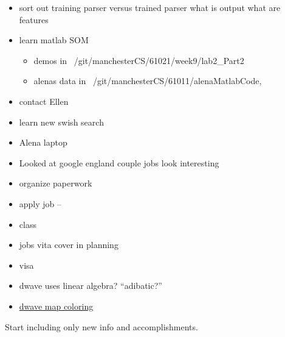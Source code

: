 \documentclass[hyperref]{labbook}
\begin{document}
\begin{itemize}
\item sort out training parser versus trained parser  what is output  what are features
\item learn matlab SOM
  \begin{itemize}
  \item demos in  ~/git/manchesterCS/61021/week9/lab2\_Part2
  \item alenas data in ~/git/manchesterCS/61011/alenaMatlabCode,
  \end{itemize}

\item contact Ellen
\end{itemize}

\begin{itemize}
\item learn new swish search
\item Alena laptop
\end{itemize}

\begin{itemize}
\item Looked at google england couple jobs look interesting
\item organize paperwork
\item apply job  -- 
\end{itemize}

\begin{itemize}
\item class
\item jobs vita  cover  in planning
\item visa
\item dwave uses linear algebra?  ``adibatic?''
\item \href{https://www.dwavesys.com/sites/default/files/Map%20Coloring%20WP2.pdf}{dwave map coloring}
\end{itemize}


Start including only new info and accomplishments.
\end{document}
